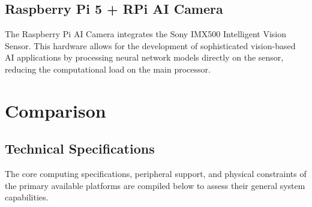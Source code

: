 \subsection{Raspberry Pi 5 + \texorpdfstring{\acrshort{RPi}}{RPi} \texorpdfstring{\acrshort{AI}}{AI} Camera}

The Raspberry Pi \gls{AI} Camera \cite{AICameraRaspberry} integrates the Sony IMX500 Intelligent Vision Sensor. This hardware allows for the development of sophisticated vision-based \gls{AI} applications by processing neural network models directly on the sensor, reducing the computational load on the main processor.

\section{Comparison}

\subsection{Technical Specifications}

The core computing specifications, peripheral support, and physical constraints of the primary available platforms are compiled below to assess their general system capabilities.

\clearpage


